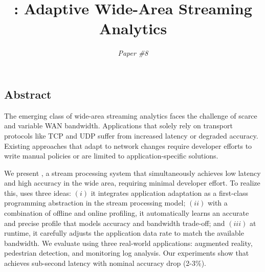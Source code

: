 \documentclass[twocolumn, 9pt]{article}
\begin{document}
\title{\sysname{}: Adaptive Wide-Area Streaming Analytics}
\author{ \textit{Paper \#8} }
\date{}
\maketitle

\subsection*{Abstract}

The emerging class of wide-area streaming analytics faces the challenge of
scarce and variable WAN bandwidth. Applications that solely rely on transport
protocols like TCP and UDP suffer from increased latency or degraded
accuracy. Existing approaches that adapt to network changes require developer
efforts to write manual policies or are limited to application-specific
solutions.

We present \sysname{}, a stream processing system that simultaneously achieves
low latency and high accuracy in the wide area, requiring minimal developer
effort. To realize this, \sysname{} uses three ideas: $(i)$ it integrates
application adaptation as a first-class programming abstraction in the stream
processing model; $(ii)$ with a combination of offline and online profiling, it
automatically learns an accurate and precise profile that models accuracy and
bandwidth trade-off; and $(iii)$ at runtime, it carefully adjusts the
application data rate to match the available bandwidth. We evaluate \sysname{}
using three real-world applications: augmented reality, pedestrian detection,
and monitoring log analysis. Our experiments show that \sysname{} achieves
sub-second latency with nominal accuracy drop (2-3\%).










% 

{\footnotesize 
}

% 
\end{document}
